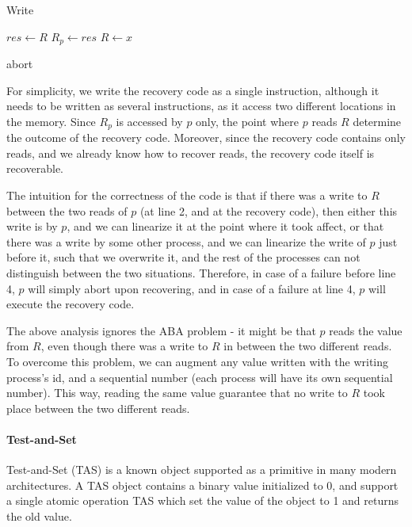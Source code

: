 \documentclass{article}
\begin{document}
\begin{algorithm}
	\caption{Write}\label{euclid}
	\begin{algorithmic}[1]
		\State $res \gets R$
		\State $R_{p} \gets res$
		\State $R \gets x$
		\EndProcedure
		
		 \Return abort
		\EndIf
		\EndProcedure
	\end{algorithmic}
\end{algorithm}

For simplicity, we write the recovery code as a single instruction, although it needs to be written as several instructions, as it access two different locations in the memory. Since $R_p$ is accessed by $p$ only, the point where $p$ reads $R$ determine the outcome of the recovery code. Moreover, since the recovery code contains only reads, and we already know how to recover reads, the recovery code itself is recoverable.

The intuition for the correctness of the code is that if there was a write to $R$ between the two reads of $p$ (at line 2, and at the recovery code), then either this write is by $p$, and we can linearize it at the point where it took affect, or that there was a write by some other process, and we can linearize the write of $p$ just before it, such that we overwrite it, and the rest of the processes can not distinguish between the two situations. Therefore, in case of a failure before line 4, $p$ will simply abort upon recovering, and in case of a failure at line 4, $p$ will execute the recovery code.

The above analysis ignores the ABA problem - it might be that $p$ reads the value from $R$, even though there was a write to $R$ in between the two different reads. To overcome this problem, we can augment any value written with the writing process's id, and a sequential number (each process will have its own sequential number). This way, reading the same value guarantee that no write to $R$ took place between the two different reads.


\paragraph*{Test-and-Set}

Test-and-Set (TAS) is a known object supported as a primitive in many modern architectures. A TAS object contains a binary value initialized to 0, and support a single atomic operation TAS which set the value of the object to 1 and returns the old value.
\end{document}
